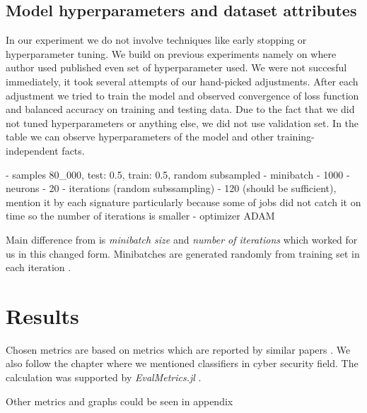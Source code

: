 \subsection{Model hyperparameters and dataset attributes}
In our experiment we do not involve techniques like early stopping or hyperparameter tuning. We build on previous experiments namely on \cite{Mandlik2020} where author used published even set of hyperparameter used. We were not succesful immediately, it took several attempts of our hand-picked adjustments. After each adjustment we tried to train the model and observed convergence of loss function and balanced accuracy on training and testing data. Due to the fact that we did not tuned hyperparameters or anything else, we did not use validation set. In the table  we can observe hyperparameters of the model and other training-independent facts.

- samples 80_000, test: 0.5, train: 0.5, random subsampled
- minibatch - 1000
- neurons - 20
- iterations (random subssampling) - 120 (should be sufficient), mention it by each signature particularly because some of jobs did not catch it on time so the number of iterations is smaller
- optimizer ADAM 

Main difference from \cite{Mandlik} is \emph{minibatch size} and \emph{number of iterations} which worked for us in this changed form. Minibatches are generated randomly from training set in each iteration .


\section{Results}
Chosen metrics are based on metrics which are reported by similar papers . We also follow the chapter  where we mentioned classifiers in cyber security field. The calculation was supported by \emph{EvalMetrics.jl} .

Other metrics and graphs could be seen in appendix 

